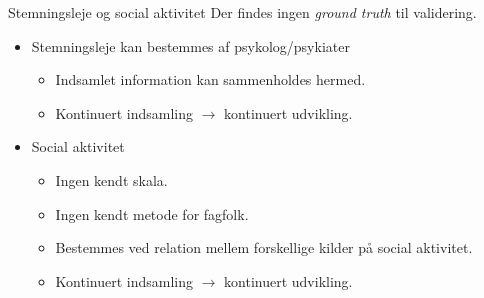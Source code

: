 \begin{frame}{Stemningsleje og social aktivitet}
Der findes ingen \textit{ground truth} til validering.
\begin{itemize}
\item Stemningsleje kan bestemmes af psykolog/psykiater
\begin{itemize}
\item Indsamlet information kan sammenholdes hermed.
\item Kontinuert indsamling $\rightarrow$ kontinuert udvikling.
\end{itemize}
\item Social aktivitet
\begin{itemize}
\item Ingen kendt skala.
\item Ingen kendt metode for fagfolk.
\item Bestemmes ved relation mellem forskellige kilder på social aktivitet.
\item Kontinuert indsamling $\rightarrow$ kontinuert udvikling.
\end{itemize}
\end{itemize}
\end{frame}

